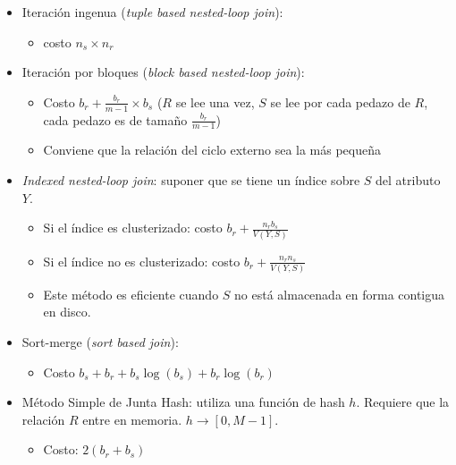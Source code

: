 \documentclass[a4paper, twoside]{article}
\newcommand{\codedir}{../resources/code} %
\begin{document}
\begin{itemize}
	\item Iteración ingenua (\emph{tuple based nested-loop join}): 
	\begin{itemize}
		\item costo $n_{s}\times n_{r}$
	\end{itemize}

	

	\item Iteración por bloques (\emph{block based nested-loop join}): 
	\begin{itemize}
		\item Costo $b_{r}+\frac{b_{r}}{m-1}\times b_{s}$ ($R$ se lee una vez, $S$ se lee por cada pedazo de $R$, cada pedazo es de tamaño $\frac{b_{r}}{m-1}$)
		\item Conviene que la relación del ciclo externo sea la más pequeña
	\end{itemize}

	

	\item \emph{Indexed nested-loop join}: suponer que se tiene un índice sobre $S$ del atributo $Y$.
	\begin{itemize}
		\item Si el índice es clusterizado: costo $b_{r}+\frac{n_{r}b_{s}}{V(Y,S)}$
		\item Si el índice no es clusterizado: costo $b_{r}+\frac{n_{r}n_{s}}{V(Y,S)}$
		\item Este método es eficiente cuando $S$ no está almacenada en forma contigua en disco.
	\end{itemize}

	

	\item Sort-merge (\emph{sort based join}): 
	\begin{itemize}
		\item Costo $b_{s}+b_{r}+b_{s}\log(b_{s})+b_{r}\log(b_{r})$
	\end{itemize}

	

	\item Método Simple de Junta Hash: utiliza una función de hash $h$. Requiere que la relación $R$ entre en memoria. $h\to[0,M-1]$.
	\begin{itemize}
		\item Costo: $2\left(b_{r}+b_{s}\right)$
	\end{itemize}


\end{itemize}
\end{document}
